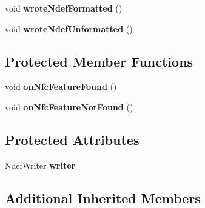 \begin{DoxyCompactItemize}
\item 
\hypertarget{classcom_1_1antares_1_1nfc_1_1client_1_1_nfc_writer_activity_a6d15c26d70d2fc6f6593b59640b572ec}{void {\bfseries wrote\-Ndef\-Formatted} ()}\label{classcom_1_1antares_1_1nfc_1_1client_1_1_nfc_writer_activity_a6d15c26d70d2fc6f6593b59640b572ec}

\item 
\hypertarget{classcom_1_1antares_1_1nfc_1_1client_1_1_nfc_writer_activity_ac38e2e17279e1aad0758f38e3b373516}{void {\bfseries wrote\-Ndef\-Unformatted} ()}\label{classcom_1_1antares_1_1nfc_1_1client_1_1_nfc_writer_activity_ac38e2e17279e1aad0758f38e3b373516}

\end{DoxyCompactItemize}
\subsection*{Protected Member Functions}
\begin{DoxyCompactItemize}
\item 
\hypertarget{classcom_1_1antares_1_1nfc_1_1client_1_1_nfc_writer_activity_a1fd3f54e7193761d478fdbc08d2698db}{void {\bfseries on\-Nfc\-Feature\-Found} ()}\label{classcom_1_1antares_1_1nfc_1_1client_1_1_nfc_writer_activity_a1fd3f54e7193761d478fdbc08d2698db}

\item 
\hypertarget{classcom_1_1antares_1_1nfc_1_1client_1_1_nfc_writer_activity_a74617658543e0b2a904bd7bc49a86180}{void {\bfseries on\-Nfc\-Feature\-Not\-Found} ()}\label{classcom_1_1antares_1_1nfc_1_1client_1_1_nfc_writer_activity_a74617658543e0b2a904bd7bc49a86180}

\end{DoxyCompactItemize}
\subsection*{Protected Attributes}
\begin{DoxyCompactItemize}
\item 
\hypertarget{classcom_1_1antares_1_1nfc_1_1client_1_1_nfc_writer_activity_a0e92848a522f3d54682567d6917dff19}{Ndef\-Writer {\bfseries writer}}\label{classcom_1_1antares_1_1nfc_1_1client_1_1_nfc_writer_activity_a0e92848a522f3d54682567d6917dff19}

\end{DoxyCompactItemize}
\subsection*{Additional Inherited Members}


